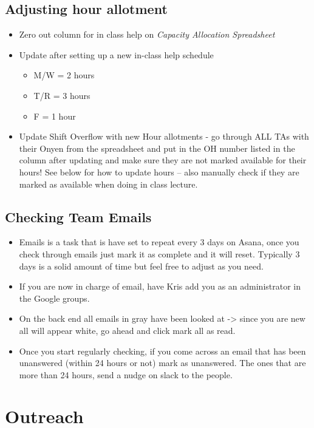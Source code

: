 \documentclass[a4paper]{article}
\begin{document}
\subsection{\label{hour_allocation} Adjusting hour allotment}
\begin{itemize}
\item Zero out column for in class help on \textit{Capacity Allocation Spreadsheet}
\item Update after setting up a new in-class help schedule
\begin{itemize}
\item M/W = 2 hours
\item T/R = 3 hours
\item F = 1 hour
\end{itemize}
\item Update Shift Overflow with new Hour allotments  - go through ALL TAs with their Onyen from the spreadsheet and put in the OH number listed in the column after updating and make sure they are not marked available for their hours! See below for how to update hours – also manually check if they are marked as available when doing in class lecture. 
\end{itemize}
\subsection{\label{team_email}Checking Team Emails}
\begin{itemize}
\item Emails is a task that is have set to repeat every 3 days on Asana, once you check through emails just mark it as complete and it will reset. Typically 3 days is a solid amount of time but feel free to adjust as you need.
\item If you are now in charge of email, have Kris add you as an administrator in the Google groups. 
\item On the back end all emails in gray have been looked at -> since you are new all will appear white, go ahead and click mark all as read. 
\item Once you start regularly checking, if you come across an email that has been unanswered (within 24 hours or not) mark as unanswered. The ones that are more than 24 hours, send a nudge on slack to the people. 
\end{itemize}
\section{Outreach}
\end{document}
